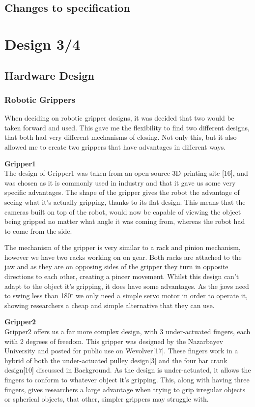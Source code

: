 \documentclass{l4proj}
\begin{document}
\section{Changes to specification}


\chapter{Design 3/4}

\section{Hardware Design}

\subsection{Robotic Grippers}
When deciding on robotic gripper designs, it was decided that two would be taken forward and used. This gave me the flexibility to find two different designs, that both had very different mechanisms of closing. Not only this, but it also allowed me to create two grippers that have advantages in different ways. 

\textbf{Gripper1}\\
The design of Gripper1 was taken from an open-source 3D printing site [16], and was chosen as it is commonly used in industry and that it gave us some very specific advantages. The shape of the gripper gives the robot the advantage of seeing what it's actually gripping, thanks to its flat design. This means that the cameras built on top of the robot, would now be capable of viewing the object being gripped no matter what angle it was coming from, whereas the robot had to come from the side.

The mechanism of the gripper is very similar to a rack and pinion mechanism, however we have two racks working on on gear. Both racks are attached to the jaw and as they are on opposing sides of the gripper they turn in opposite directions to each other, creating a pincer movement. Whilst this design can't adapt to the object it's gripping, it does have some advantages. As the jaws need to swing less than 180$^{\circ}$ we only need a simple servo motor in order to operate it, showing researchers a cheap and simple alternative that they can use. 

\textbf{Gripper2}\\
Gripper2 offers us a far more complex design, with 3 under-actuated fingers, each with 2 degrees of freedom. This gripper was designed by the Nazarbayev University and posted for public use on Wevolver[17]. These fingers work in a hybrid of both the under-actuated pulley design[3] and the four bar crank design[10] discussed in Background. As the design is under-actuated, it allows the fingers to conform to whatever object it's gripping. This, along with having three fingers, gives researchers a large advantage when trying to grip irregular objects or spherical objects, that other, simpler grippers may struggle with. 
\end{document}
